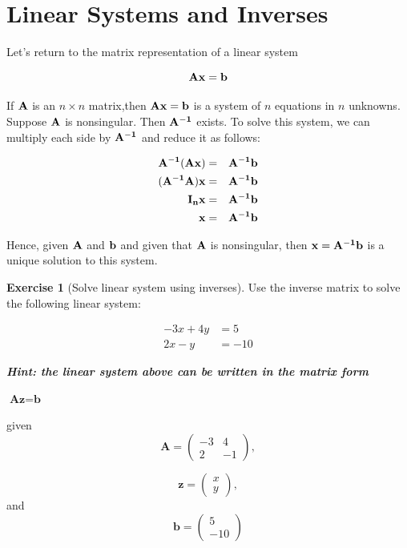 \documentclass[
]{book}
\theoremstyle{definition}
\theoremstyle{definition}
\theoremstyle{definition}
\newtheorem{exercise}{Exercise}[chapter]
\theoremstyle{remark}
\begin{document}
\hypertarget{linear-systems-and-inverses}{%
\section{Linear Systems and Inverses}\label{linear-systems-and-inverses}}

Let's return to the matrix representation of a linear system

\[\bf{Ax} = \bf{b}\]

If \(\bf{A}\) is an \(n\times n\) matrix,then \(\bf{Ax}=\bf{b}\) is a system of \(n\) equations in \(n\) unknowns. Suppose \(\bf{A}\) is nonsingular. Then \(\bf{A}^{-1}\) exists. To solve this system, we can multiply each side by \(\bf{A}^{-1}\) and reduce it as follows:

\begin{eqnarray*} 
\bf{A}^{-1} (\bf{A} \bf{x}) & = & \bf{A}^{-1} \bf{b} \\
(\bf{A}^{-1} \bf{A})\bf{x} & = & \bf{A}^{-1} \bf{b}\\
\bf{I}_n \bf{x}     & = & \bf{A}^{-1} \bf{b}\\
\bf{x} & = & \bf{A}^{-1} \bf{b}
\end{eqnarray*}

Hence, given \(\bf{A}\) and \(\bf{b}\) and given that \(\bf{A}\) is nonsingular, then \(\bf{x} = \bf{A}^{-1} \bf{b}\) is a unique solution to this system.

\begin{exercise}[Solve linear system using inverses]
\protect\hypertarget{exr:invlinsys}{}{\label{exr:invlinsys} {} }
Use the inverse matrix to solve the following linear system:

\begin{align*} 
-3x + 4y &= 5 \\
2x - y &= -10
\end{align*}

\textbf{\emph{Hint: the linear system above can be written in the matrix form}}

\(\textbf{A}\textbf{z} = \textbf{b}\)

given \[\textbf{A} = \begin{pmatrix} -3&4\\2&-1 \end{pmatrix},\]

\[\textbf{z} = \begin{pmatrix} x\\y \end{pmatrix},\]
and
\[\textbf{b} = \begin{pmatrix} 5\\-10 \end{pmatrix}\]
\end{exercise}
\end{document}
